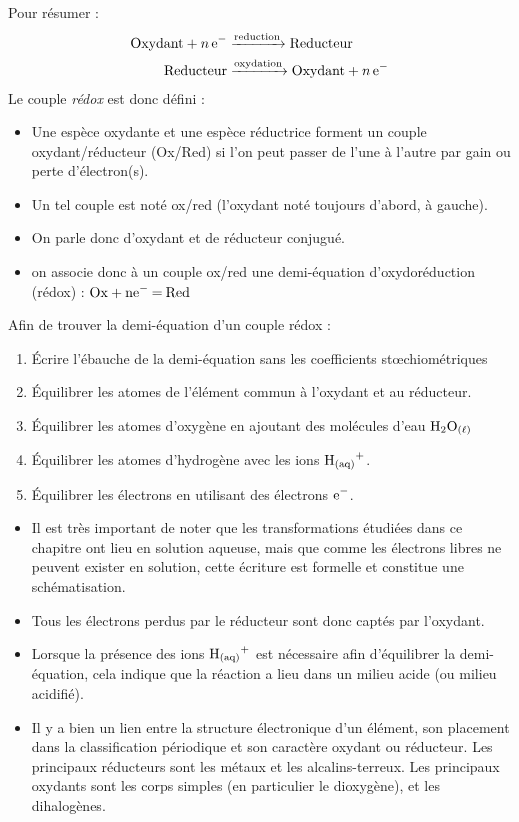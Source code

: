 \documentclass[11pt,a4paper]{article}
\begin{document}
Pour résumer : 
\begin{align*}
    \ce{Oxydant + n e- &->[reduction] Reducteur } \\
    \ce{Reducteur &->[oxydation] Oxydant + n e- }
\end{align*}      
\newpage
Le couple \textit{rédox} est donc défini : 
\begin{itemize}
    \item Une espèce oxydante et une espèce réductrice forment un couple oxydant/réducteur (Ox/Red) si l’on peut passer de l’une à l’autre par gain ou perte d’électron(s).
    \item Un tel couple est noté ox/red (l’oxydant noté toujours d’abord, à gauche). \item On parle donc d’oxydant et de réducteur conjugué.  
    \item on associe donc à un couple ox/red une demi-équation d’oxydoréduction (rédox) : $\ce{Ox + ne- = Red}$
\end{itemize}
Afin de trouver la demi-équation d'un couple rédox : 
\begin{mdframed}[backgroundcolor=red!5]
\begin{enumerate}
    \item Écrire l’ébauche de la demi-équation sans les coefficients stœchiométriques
    \item Équilibrer les atomes de l’élément commun à l’oxydant et au réducteur.
    \item Équilibrer les atomes d’oxygène en ajoutant des molécules d’eau  $\ce{H2O_{(\ell)}}$
    \item Équilibrer les atomes d’hydrogène avec les ions $\ce{H+_{(aq)}}$.
    \item Équilibrer les électrons en utilisant des électrons $\ce{e-}$.
\end{enumerate}
\end{mdframed}

\begin{rmrq}
\begin{itemize}
    \item Il est très important de noter que les transformations étudiées dans ce chapitre ont lieu en solution aqueuse, mais que comme les électrons libres ne peuvent exister en solution, cette écriture est formelle et constitue une schématisation.  
    \item Tous les électrons perdus par le réducteur sont donc captés par l’oxydant.  
    \item Lorsque la présence des ions $\ce{H+_{(aq)}}$ est nécessaire afin d’équilibrer la demi-équation, cela indique que la réaction a lieu dans un milieu acide (ou milieu acidifié).  
	\item Il y a bien un lien entre la structure électronique d’un élément, son placement dans la classification périodique et son caractère oxydant ou réducteur.  Les principaux réducteurs sont les métaux et les alcalins-terreux.  Les principaux oxydants sont les corps simples (en particulier le dioxygène), et les dihalogènes.  
\end{itemize}
\end{rmrq}
\end{document}
